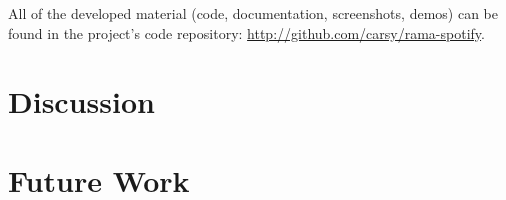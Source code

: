   All of the developed material (code, documentation, screenshots, demos) can be found in the project's code repository: \url{http://github.com/carsy/rama-spotify}.


\section{Discussion} %
\label{sec:discussion}




\section{Future Work} %
\label{sec:future_work}




